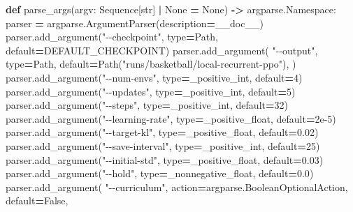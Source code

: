 \documentclass[
  chinese,
  11pt,
  letterpaper,
]{article}
\newenvironment{Shaded}{\begin{snugshade}}{\end{snugshade}}
\newcommand{\BuiltInTok}[1]{#1}
\newcommand{\DecValTok}[1]{\textcolor[rgb]{0.00,0.00,0.81}{#1}}
\newcommand{\FloatTok}[1]{\textcolor[rgb]{0.00,0.00,0.81}{#1}}
\newcommand{\KeywordTok}[1]{\textcolor[rgb]{0.13,0.29,0.53}{\textbf{#1}}}
\newcommand{\NormalTok}[1]{#1}
\newcommand{\OperatorTok}[1]{\textcolor[rgb]{0.81,0.36,0.00}{\textbf{#1}}}
\newcommand{\StringTok}[1]{\textcolor[rgb]{0.31,0.60,0.02}{#1}}
\newcommand{\VariableTok}[1]{\textcolor[rgb]{0.00,0.00,0.00}{#1}}
\renewenvironment{Shaded}{\par\smallskip}{\par\smallskip}
\begin{document}
\begin{Shaded}
\begin{Highlighting}[]
\KeywordTok{def}\NormalTok{ parse\_args(argv: Sequence[}\BuiltInTok{str}\NormalTok{] }\OperatorTok{|} \VariableTok{None} \OperatorTok{=} \VariableTok{None}\NormalTok{) }\OperatorTok{{-}\textgreater{}}\NormalTok{ argparse.Namespace:}
\NormalTok{    parser }\OperatorTok{=}\NormalTok{ argparse.ArgumentParser(description}\OperatorTok{=}\NormalTok{\_\_doc\_\_)}
\NormalTok{    parser.add\_argument(}\StringTok{"{-}{-}checkpoint"}\NormalTok{, }\BuiltInTok{type}\OperatorTok{=}\NormalTok{Path, default}\OperatorTok{=}\NormalTok{DEFAULT\_CHECKPOINT)}
\NormalTok{    parser.add\_argument(}
        \StringTok{"{-}{-}output"}\NormalTok{,}
        \BuiltInTok{type}\OperatorTok{=}\NormalTok{Path,}
\NormalTok{        default}\OperatorTok{=}\NormalTok{Path(}\StringTok{"runs/basketball/local{-}recurrent{-}ppo"}\NormalTok{),}
\NormalTok{    )}
\NormalTok{    parser.add\_argument(}\StringTok{"{-}{-}num{-}envs"}\NormalTok{, }\BuiltInTok{type}\OperatorTok{=}\NormalTok{\_positive\_int, default}\OperatorTok{=}\DecValTok{4}\NormalTok{)}
\NormalTok{    parser.add\_argument(}\StringTok{"{-}{-}updates"}\NormalTok{, }\BuiltInTok{type}\OperatorTok{=}\NormalTok{\_positive\_int, default}\OperatorTok{=}\DecValTok{5}\NormalTok{)}
\NormalTok{    parser.add\_argument(}\StringTok{"{-}{-}steps"}\NormalTok{, }\BuiltInTok{type}\OperatorTok{=}\NormalTok{\_positive\_int, default}\OperatorTok{=}\DecValTok{32}\NormalTok{)}
\NormalTok{    parser.add\_argument(}\StringTok{"{-}{-}learning{-}rate"}\NormalTok{, }\BuiltInTok{type}\OperatorTok{=}\NormalTok{\_positive\_float, default}\OperatorTok{=}\FloatTok{2e{-}5}\NormalTok{)}
\NormalTok{    parser.add\_argument(}\StringTok{"{-}{-}target{-}kl"}\NormalTok{, }\BuiltInTok{type}\OperatorTok{=}\NormalTok{\_positive\_float, default}\OperatorTok{=}\FloatTok{0.02}\NormalTok{)}
\NormalTok{    parser.add\_argument(}\StringTok{"{-}{-}save{-}interval"}\NormalTok{, }\BuiltInTok{type}\OperatorTok{=}\NormalTok{\_positive\_int, default}\OperatorTok{=}\DecValTok{25}\NormalTok{)}
\NormalTok{    parser.add\_argument(}\StringTok{"{-}{-}initial{-}std"}\NormalTok{, }\BuiltInTok{type}\OperatorTok{=}\NormalTok{\_positive\_float, default}\OperatorTok{=}\FloatTok{0.03}\NormalTok{)}
\NormalTok{    parser.add\_argument(}\StringTok{"{-}{-}hold"}\NormalTok{, }\BuiltInTok{type}\OperatorTok{=}\NormalTok{\_nonnegative\_float, default}\OperatorTok{=}\FloatTok{0.0}\NormalTok{)}
\NormalTok{    parser.add\_argument(}
        \StringTok{"{-}{-}curriculum"}\NormalTok{,}
\NormalTok{        action}\OperatorTok{=}\NormalTok{argparse.BooleanOptionalAction,}
\NormalTok{        default}\OperatorTok{=}\VariableTok{False}\NormalTok{,}

\end{Highlighting}
\end{Shaded}
\end{document}

